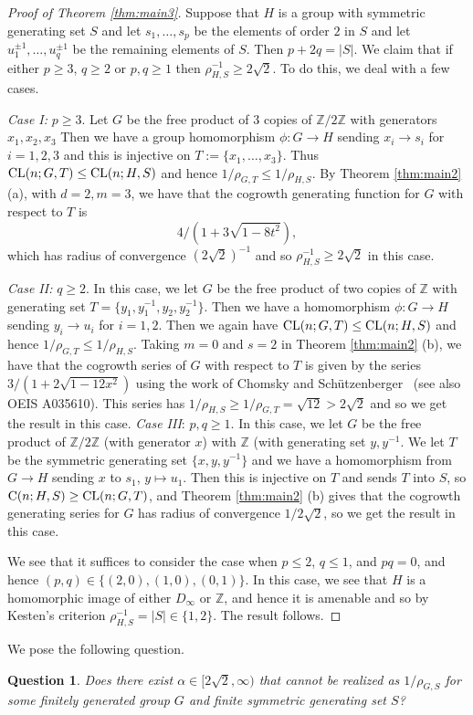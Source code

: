 \documentclass[11pt]{amsart}
\newtheorem{question}[theorem]{Question}
\theoremstyle{definition}
\begin{document}
\begin{proof}[Proof of Theorem \ref{thm:main3}]
Suppose that $H$ is a group with symmetric generating set $S$ and let $s_1,\ldots ,s_p$ be the elements of order $2$ in $S$ and let 
$u_1^{\pm 1},\ldots ,u_q^{\pm 1}$ be the remaining elements of $S$.  Then $p+2q=|S|$.  We claim that if either $p\ge 3$, $q\ge 2$ or $p,q\ge 1$ then $\rho_{H,S}^{-1}\ge 2\sqrt{2}$.  To do this, we deal with a few cases.

\emph{Case I:} $p\ge 3$.
Let $G$ be the free product of $3$ copies of $\mathbb{Z}/2\mathbb{Z}$ with generators $x_1,x_2,x_3$
Then we have a group homomorphism $\phi:G\to H$ sending $x_i\to s_i$ for $i=1,2,3$ and this is injective on
$T:=\{x_1,\ldots ,x_3\}$.  Thus
${\rm CL}(n;G,T)\le {\rm CL}(n;H,S)$ and hence $1/\rho_{G,T} \le  1/\rho_{H,S}$.
By Theorem \ref{thm:main2} (a), with $d=2,m=3$, we have that the cogrowth generating function for $G$ with respect to $T$ is
$$4/\left(1+3\sqrt{1-8t^2}\right),$$ which has radius of convergence ${\left(2\sqrt{2}\right)}^{-1}$ and so $\rho_{H,S}^{-1}\ge 2\sqrt{2}$ in this case. 

\emph{Case II:} $q\ge 2$.
In this case, we let $G$ be the free product of two copies of $\mathbb{Z}$ with generating set $T=\{y_1,y_1^{-1}, y_2,y_2^{-1}\}$.  Then we have a homomorphism $\phi: G\to H$ sending $y_i\to u_i$ for $i=1,2$.  Then we again have
${\rm CL}(n;G,T)\le {\rm CL}(n;H,S)$ and hence $1/\rho_{G,T} \le  1/\rho_{H,S}$. Taking $m=0$ and $s=2$ in Theorem \ref{thm:main2} (b), we have that the cogrowth series of $G$ with respect to $T$ is given by the series $3/(1+2\sqrt{1-12x^2})$ using the work of Chomsky and Sch\"utzenberger~\cite{chomsky} (see also OEIS A035610).  This series has $1/\rho_{H,S}\ge 1/\rho_{G,T} =\sqrt{12}>2\sqrt{2}$ and so we get the result in this case.
\vskip 2mm
\emph{Case III}: $p,q\ge 1$.
In this case, we let $G$ be the free product of $\mathbb{Z}/2\mathbb{Z}$ (with generator $x$) with $\mathbb{Z}$ (with generating set $y,y^{-1}$.  We let $T$ be the symmetric generating set $\{x,y,y^{-1}\}$ and we have a homomorphism from $G\to H$ sending $x$ to $s_1$, $y\mapsto u_1$. Then this is injective on $T$ and sends $T$ into $S$, so
${\rm C}(n;H,S)\ge {\rm CL}(n;G,T)$, and Theorem \ref{thm:main2} (b) gives that the cogrowth generating series for $G$ has radius of convergence $1/2\sqrt{2}$, so we get the result in this case.

We see that it suffices to consider the case when $p\le 2$, $q\le 1$, and $pq=0$, and  hence $(p,q)\in \{(2,0), (1,0), (0,1)\}$.  In this case, we see that $H$ is a homomorphic image of either $D_{\infty}$ or $\mathbb{Z}$, and hence it is amenable and so by Kesten's criterion $\rho_{H,S}^{-1}=|S|\in \{1,2\}$.  The result follows.
\end{proof}
We pose the following question.
\begin{question} Does there exist $\alpha\in [2\sqrt{2},\infty)$ that cannot be realized as $1/\rho_{G,S}$ for some finitely generated group $G$ and finite symmetric generating set $S$?
\end{question}
\end{document}
